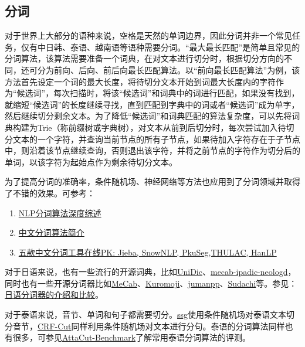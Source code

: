\documentclass[cn,10pt,math=newtx,citestyle=gb7714-2015,bibstyle=gb7714-2015]{elegantbook}
\begin{document}
\subsection{分词}

对于世界上大部分的语种来说，空格是天然的单词边界，因此分词并非一个常见任务，仅有中日韩、泰语、越南语等语种需要分词。“最大最长匹配”是简单且常见的分词算法，该算法需要准备一个词典，在对文本进行切分时，根据切分方向的不同，还可分为前向、后向、前后向最长匹配算法。以“前向最长匹配算法”为例，该方法首先设定一个词的最大长度，将待切分文本开始到词最大长度内的字符作为“候选词”，每次扫描时，将该“候选词”和词典中的词进行匹配，如果没有找到，就缩短“候选词”的长度继续寻找，直到匹配到字典中的词或者“候选词”成为单字，然后继续切分剩余文本。为了降低“候选词”和词典匹配的算法复杂度，可以先将词典构建为Trie（称前缀树或字典树），对文本从前到后切分时，每次尝试加入待切分文本的一个字符，并查询当前节点的所有子节点，如果待加入字符存在于子节点中，则沿着该节点继续查询，否则退出该字符，并将之前节点的字符作为切分后的单词，以该字符为起始点作为剩余待切分文本。

为了提高分词的准确率，条件随机场、神经网络等方法也应用到了分词领域并取得了不错的效果。可参考：

\begin{enumerate}
  \item \href{https://zhuanlan.zhihu.com/p/50444885}{NLP分词算法深度综述}
  \item \href{https://zhuanlan.zhihu.com/p/33261835}{中文分词算法简介}
  \item \href{https://zhuanlan.zhihu.com/p/64409753}{五款中文分词工具在线PK: Jieba, SnowNLP, PkuSeg,THULAC, HanLP}
\end{enumerate}

对于日语来说，也有一些流行的开源词典，比如\href{https://unidic.ninjal.ac.jp/}{UniDic}、\href{https://github.com/neologd/mecab-ipadic-neologd}{mecab-ipadic-neologd}，同时也有一些开源分词器比如\href{https://taku910.github.io/mecab/}{MeCab}、\href{https://www.atilika.org/}{Kuromoji}、\href{https://github.com/ku-nlp/jumanpp}{jumanpp}、\href{https://github.com/WorksApplications/Sudachi}{Sudachi}等。参见：\href{https://www.codercto.com/a/85083.html}{日语分词器的介绍和比较}。

对于泰语来说，音节、单词和句子都需要切分。\href{https://github.com/ponrawee/ssg}{ssg}使用条件随机场对泰语文本切分音节，\href{https://github.com/vistec-AI/crfcut}{CRF-Cut}同样利用条件随机场对文本进行分句。泰语的分词算法同样也有很多，可参见\href{https://pythainlp.github.io/attacut/benchmark.html}{AttaCut-Benchmark}了解常用泰语分词算法的评测。
\end{document}
